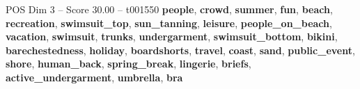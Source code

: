 \begin{textsample}{POS Dim 3 – Score 30.00 – t001550}  \label{ex:f3_pos_003}
\textbf{people}, \textbf{crowd}, \textbf{summer}, \textbf{fun}, \textbf{beach}, \textbf{recreation}, \textbf{swimsuit\_top}, \textbf{sun\_tanning}, \textbf{leisure}, \textbf{people\_on\_beach}, \textbf{vacation}, \textbf{swimsuit}, \textbf{trunks}, \textbf{undergarment}, \textbf{swimsuit\_bottom}, \textbf{bikini}, \textbf{barechestedness}, \textbf{holiday}, \textbf{boardshorts}, \textbf{travel}, \textbf{coast}, \textbf{sand}, \textbf{public\_event}, \textbf{shore}, \textbf{human\_back}, \textbf{spring\_break}, \textbf{lingerie}, \textbf{briefs}, \textbf{active\_undergarment}, \textbf{umbrella}, \textbf{bra}

\end{textsample}
